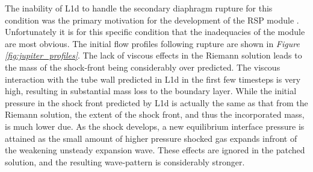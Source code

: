 \documentclass[a4paper,10pt]{article}
\begin{document}
The inability of L1d to handle the secondary diaphragm rupture for this condition was the primary motivation for the development of the RSP module \cite{my_ug_thesis}.  Unfortunately it is for this specific condition that the inadequacies of the module are most obvious. The initial flow profiles following rupture are shown in 
\emph{Figure \ref{fig:jupiter_profiles}}.  The lack of viscous effects in the Riemann solution leads to the mass of the shock-front being considerably over predicted. The viscous interaction with the tube wall predicted in L1d in the first few timesteps is very high, resulting in substantial mass loss to the boundary layer.  While the initial pressure in the shock front predicted by L1d is actually the same as that from the Riemann solution, the extent of the shock front, and thus the incorporated mass, is much lower due.  As the shock develops, a new equilibrium interface pressure is attained as the small amount of higher pressure shocked gas expands infront of the weakening unsteady expansion wave.  These effects are ignored in the patched solution, and the resulting wave-pattern is considerably stronger.

\par \medskip
\end{document}
